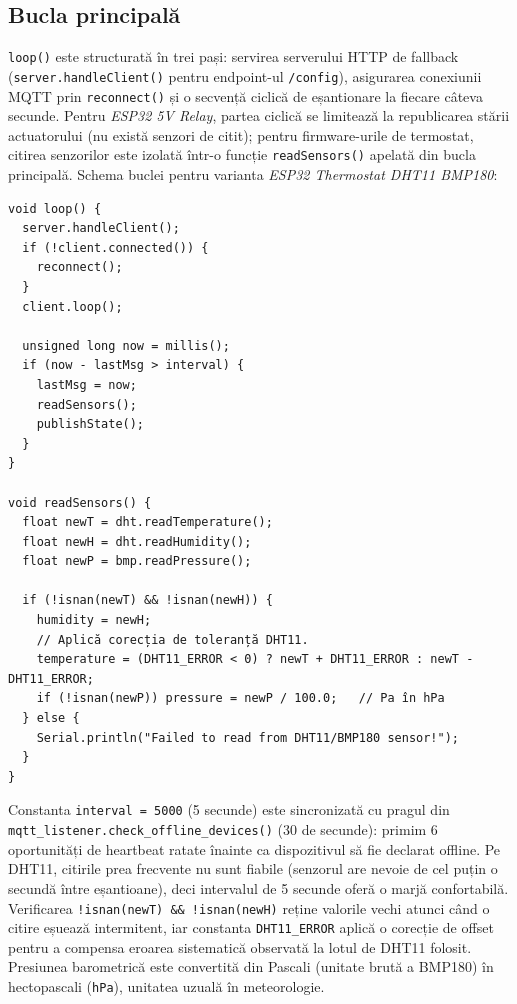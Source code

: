 \subsection{Bucla principală}
\texttt{loop()} este structurată în trei pași: servirea serverului HTTP de fallback (\texttt{server.handleClient()} pentru endpoint-ul \texttt{/config}), asigurarea conexiunii MQTT prin \texttt{reconnect()} și o secvență ciclică de eșantionare la fiecare câteva secunde. Pentru \emph{ESP32 5V Relay}, partea ciclică se limitează la republicarea stării actuatorului (nu există senzori de citit); pentru firmware-urile de termostat, citirea senzorilor este izolată într-o funcție \texttt{readSensors()} apelată din bucla principală. Schema buclei pentru varianta \emph{ESP32 Thermostat DHT11 BMP180}:
\begin{verbatim}
void loop() {
  server.handleClient();
  if (!client.connected()) {
    reconnect();
  }
  client.loop();

  unsigned long now = millis();
  if (now - lastMsg > interval) {
    lastMsg = now;
    readSensors();
    publishState();
  }
}

void readSensors() {
  float newT = dht.readTemperature();
  float newH = dht.readHumidity();
  float newP = bmp.readPressure();

  if (!isnan(newT) && !isnan(newH)) {
    humidity = newH;
    // Aplică corecția de toleranță DHT11.
    temperature = (DHT11_ERROR < 0) ? newT + DHT11_ERROR : newT - DHT11_ERROR;
    if (!isnan(newP)) pressure = newP / 100.0;   // Pa în hPa
  } else {
    Serial.println("Failed to read from DHT11/BMP180 sensor!");
  }
}
\end{verbatim}
Constanta \texttt{interval = 5000} (5 secunde) este sincronizată cu pragul din \texttt{mqtt\_listener.check\_offline\_devices()} (30 de secunde): primim 6 oportunități de heartbeat ratate înainte ca dispozitivul să fie declarat offline. Pe DHT11, citirile prea frecvente nu sunt fiabile (senzorul are nevoie de cel puțin o secundă între eșantioane), deci intervalul de 5 secunde oferă o marjă confortabilă. Verificarea \texttt{!isnan(newT) \&\& !isnan(newH)} reține valorile vechi atunci când o citire eșuează intermitent, iar constanta \texttt{DHT11\_ERROR} aplică o corecție de offset pentru a compensa eroarea sistematică observată la lotul de DHT11 folosit. Presiunea barometrică este convertită din Pascali (unitate brută a BMP180) în hectopascali (\texttt{hPa}), unitatea uzuală în meteorologie.


